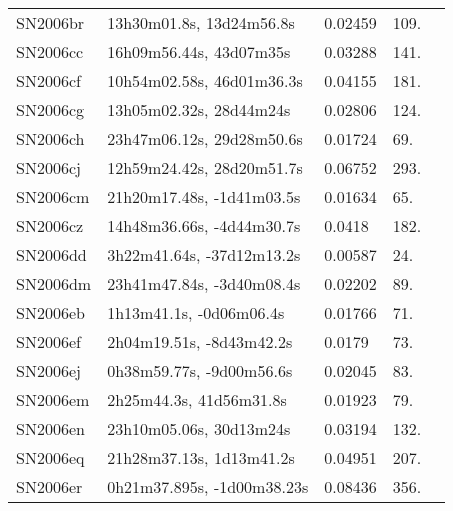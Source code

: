 \begin{longtable}{lllll}
         SN2006br &       13h30m01.8s, 13d24m56.8s &  0.02459 &           109. &    \citet{1997AJ....113.1197H} \\
         SN2006cc &        16h09m56.44s, 43d07m35s &  0.03288 &           141. &    \citet{2016SDSSD.C...0000:} \\
         SN2006cf &      10h54m02.58s, 46d01m36.3s &  0.04155 &           181. &    \citet{2005SDSS4.C...0000:} \\
         SN2006cg &        13h05m02.32s, 28d44m24s &  0.02806 &           124. &    \citet{2003AJ....126.2152R} \\
         SN2006ch &      23h47m06.12s, 29d28m50.6s &  0.01724 &            69. &  \citet{1996AandAS..115..407R} \\
         SN2006cj &      12h59m24.42s, 28d20m51.7s &  0.06752 &           293. &  \citet{2003AandA...401..471C} \\
         SN2006cm &      21h20m17.48s, -1d41m03.5s &  0.01634 &            65. &  \citet{1998AandAS..130..333T} \\
         SN2006cz &      14h48m36.66s, -4d44m30.7s &   0.0418 &           182. &    \citet{20032dF...C...0000C} \\
         SN2006dd &      3h22m41.64s, -37d12m13.2s &  0.00587 &            24. &  \citet{1998AandAS..130..267L} \\
         SN2006dm &      23h41m47.84s, -3d40m08.4s &  0.02202 &            89. &  \citet{1998AandAS..130..333T} \\
         SN2006eb &        1h13m41.1s, -0d06m06.4s &  0.01766 &            71. &    \citet{2016SDSSD.C...0000:} \\
         SN2006ef &       2h04m19.51s, -8d43m42.2s &   0.0179 &            73. &    \citet{2008AJ....135.2424O} \\
         SN2006ej &       0h38m59.77s, -9d00m56.6s &  0.02045 &            83. &    \citet{2003SDSS1.C...0000:} \\
         SN2006em &        2h25m44.3s, 41d56m31.8s &  0.01923 &            79. &    \citet{1999ApJS..121..287H} \\
         SN2006en &        23h10m05.06s, 30d13m24s &  0.03194 &           132. &    \citet{1991RC3.9.C...0000d} \\
         SN2006eq &       21h28m37.13s, 1d13m41.2s &  0.04951 &           207. &    \citet{2004SDSS3.C...0000:} \\
         SN2006er &     0h21m37.895s, -1d00m38.23s &  0.08436 &           356. &    \citet{2003SDSS1.C...0000:} \\

\end{longtable}
